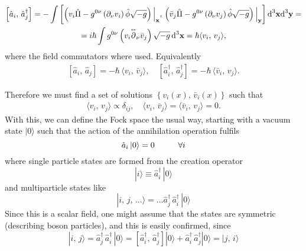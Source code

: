 \begin{multline}
	\left[\hat{a}_i,\,\hat{a}_j^\dagger\right]=-\int\left[\left(v_i\hat{\Pi}-g^{0\nu}\left(\partial_\nu v_i\right)\hat{\phi}\sqrt{-g}\right)\Big|_\mathbf{x},\,\left(\bar v_j\hat{\Pi}-g^{0\nu}\left(\partial_\nu v_j\right)\hat{\phi}\sqrt{-g}\right)\Big|_\mathbf{y}\right]\text{d}^3\mathbf{x}\text{d}^3\mathbf{y}=\\
	=i\hbar\int g^{0\nu}\left(v_i\overset{\text{\tiny$\leftrightarrow$}}{\partial}_\nu \bar v_j\right)\sqrt{-g}\,\text{d}^3\mathbf{x}=\hbar\langle v_i,\,v_j\rangle,
\end{multline}
where the field commutators where used. Equivalently
\begin{subequations}
	\begin{gather}
		\left[\hat{a}_i,\,\hat{a}_j\right]=-\hbar\,\langle v_i,\,\bar v_j\rangle,\quad \left[\hat{a}_i^\dagger,\,\hat{a}_j^\dagger\right]=-\hbar\,\langle \bar v_i,\,v_j\rangle. \tag{\theequation \,\,a,b}
	\end{gather}
\end{subequations}

Therefore we must find a set of solutions $\left\{v_i(x),\,\bar v_i(x)\right\}$ such that
\begin{subequations}\label{eq: Operational Rules}
	\begin{gather}
		\langle v_i,\,v_j\rangle\propto \delta_{ij},\quad \langle v_i,\,\bar v_j\rangle=\langle \bar v_i,\,v_j\rangle=0. \tag{\theequation \,\,a-c}
	\end{gather}
\end{subequations}
With this, we can define the Fock space the usual way, starting with a vacuum state $|0\rangle$ such that the action of the annihilation operation fulfils
\begin{equation}
	\hat{a}_i\,|0\rangle=0\hspace{1.0cm}\forall i
\end{equation}
where single particle states are formed from the creation operator
\begin{equation}
	|i\rangle\equiv \hat{a}^\dagger_i\,|0\rangle
\end{equation}
and multiparticle states like
\begin{equation}
	|i,\,j,\,\hdots\rangle=\hdots \hat{a}_j^\dagger\,\hat{a}_i^\dagger\,|0\rangle
\end{equation}
Since this is a scalar field, one might assume that the states are symmetric (describing boson particles), and this is easily confirmed, since
\begin{equation}
	|i,\,j\rangle=\hat{a}_j^\dagger\,\hat{a}_i^\dagger\,|0\rangle=\left[\hat{a}_i^\dagger,\,\hat{a}_j^\dagger\right]|0\rangle+\hat{a}_i^\dagger\,\hat{a}_j^\dagger|0\rangle=|j,\,i\rangle
\end{equation}
